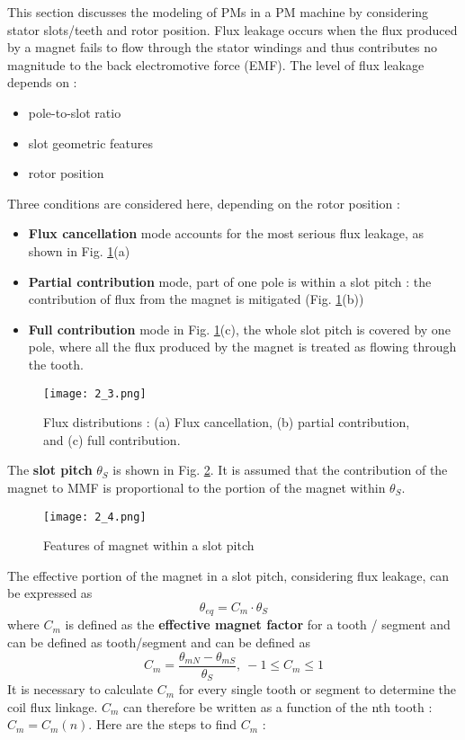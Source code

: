 This section discusses the modeling of PMs in a PM machine by considering stator slots/teeth and rotor position. Flux leakage occurs when the flux produced by a magnet fails to flow through the stator windings and thus contributes no magnitude to the back electromotive force (EMF). The level of flux leakage depends on :
\begin{itemize}
    \item pole-to-slot ratio
    \item slot geometric features
    \item rotor position
\end{itemize}

Three conditions are considered here, depending on the rotor position :
\begin{itemize}
    \item \textbf{Flux cancellation} mode accounts for the most serious flux leakage, as shown in Fig. \ref{2.3}(a)
    \item \textbf{Partial contribution} mode, part of one pole is within a slot pitch : the contribution of flux from the magnet is mitigated (Fig. \ref{2.3}(b))
    \item \textbf{Full contribution} mode in Fig. \ref{2.3}(c), the whole slot pitch is covered by one pole, where all the flux produced by the magnet is treated as flowing through the tooth.
\end{itemize}

\begin{figure}[H]
    \centering
    \texttt{[image: 2\_3.png]}
      \caption{Flux distributions : (a) Flux cancellation, (b) partial contribution, and (c) full contribution.}
      \label{2.3}
\end{figure}

The \textbf{slot pitch} $\theta_S$ is shown in Fig. \ref{2.4}. It is assumed that the contribution of the magnet to MMF is proportional to the portion of the magnet within $\theta_S$.

\begin{figure}[H]
    \centering
    \texttt{[image: 2\_4.png]}
    \caption{Features of magnet within a slot pitch}
    \label{2.4}
\end{figure}

The effective portion of the magnet in a slot pitch, considering flux leakage, can be expressed as $$\theta_{eq} = C_m \cdot \theta_S $$ where $C_m$ is defined as the \textbf{effective magnet factor} for a tooth / segment and can be defined as
tooth/segment and can be defined as $$C_m = \frac{\theta_{mN}-\theta_{mS}}{\theta_S}, \ -1 \leq C_m \leq 1$$
It is necessary to calculate $C_m$ for every single tooth or segment to determine the coil flux linkage. $C_m$ can therefore be written as a function of the nth tooth : $C_m = C_m(n)$. Here are the steps to find $C_m$ :
